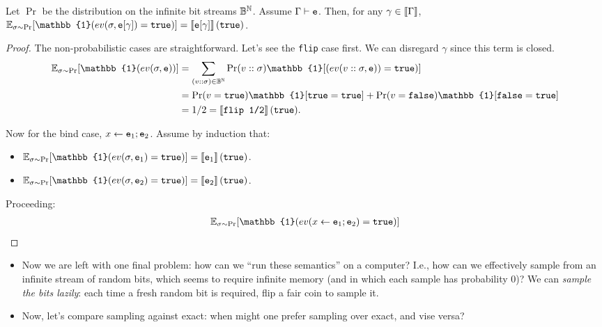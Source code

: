 \documentclass{tufte-handout}
\begin{document}
\begin{theorem}
  Let $\Pr$ be the distribution on the infinite bit streams $\mathbb{B}^{\mathbb{N}}$. Assume $\Gamma \vdash \texttt{e}$.
  Then, for any $\gamma \in \left \llbracket {\Gamma} \right \rrbracket$,
  $\E_{\sigma \sim \Pr}[\mathbb{1}(ev(\sigma, \te[\gamma]) = \true)] = \dbracket{\te[\gamma]}(\true)$.
\end{theorem}
\begin{proof}
  The non-probabilistic cases are straightforward. Let's see the \texttt{flip} 
  case first. We can disregard $\gamma$ since this term is closed.
  \begin{align*}
    \E_{\sigma \sim \Pr}[\mathbb{1}(ev(\sigma, \te))] &= 
    \sum_{(v :: \sigma ) \in \bool^\nat} \Pr(v::\sigma) \mathbb{1}[(ev(v::\sigma, \te)) = \true)] \\ 
    &= \Pr(v = \true) \mathbb{1}[\true = \true] + \Pr(v = \false)\mathbb{1}[\false = \true] \\ 
    &= 1/2 = \dbracket{\texttt{flip~1/2}}(\true).
  \end{align*}

  Now for the bind case, $x \leftarrow \texttt{e}_1; \texttt{e}_2$. Assume by induction that:
  \begin{itemize}
    \item $\E_{\sigma \sim \Pr}[\mathbb{1}(ev(\sigma, \te_1) = \true)] = \dbracket{\te_1}(\true)$.
    \item $\E_{\sigma \sim \Pr}[\mathbb{1}(ev(\sigma, \te_2) = \true)] = \dbracket{\te_2}(\true)$.
  \end{itemize}
  Proceeding:
  \begin{align*}
    \E_{\sigma \sim \Pr}[\mathbb{1}(ev(x \leftarrow \te_1; \te_2) = \true)]
  \end{align*}
\end{proof}

\begin{itemize}
  \item Now we are left with one final problem: how can we ``run these
  semantics'' on a computer?  I.e., how can we effectively sample from an
  infinite stream of random bits, which seems to require infinite memory (and in
  which each sample has probability 0)? We can \emph{sample the bits lazily}: 
  each time a fresh random bit is required, flip a fair coin to sample it.

  \item Now, let's compare sampling against exact: when might one prefer 
  sampling over exact, and vise versa?
\end{itemize}



\end{document}

